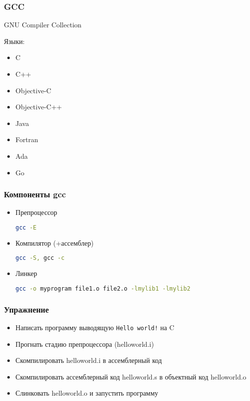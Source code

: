 \begin{frame}[fragile]
	\frametitle{GCC}

	\begin{block}{GNU Compiler Collection}

		Языки:

		\begin{itemize}
			\item C
			\item C++
			\item Objective-C
			\item Objective-C++
			\item Java
			\item Fortran
			\item Ada
			\item Go
		\end{itemize}
	\end{block}

\end{frame}



\begin{frame}[fragile]
\frametitle{Компоненты gcc}
\begin{itemize}
  \item Препроцессор
\begin{lstlisting}[language=sh]
gcc -E
\end{lstlisting}
  \item Компилятор (+ассемблер)
\begin{lstlisting}[language=sh]
gcc -S, gcc -c
\end{lstlisting}
  \item Линкер
\begin{lstlisting}[language=sh]
gcc -o myprogram file1.o file2.o -lmylib1 -lmylib2
\end{lstlisting}
\end{itemize}
\end{frame}

\begin{frame}
\frametitle{Упражнение}
\begin{itemize}
  \item Написать программу выводящую {\tt Hello world!} на C
  \item Прогнать стадию препроцессора (helloworld.i)
  \item Скомпилировать helloworld.i в ассемблерный код
  \item Скомпилировать ассемблерный код helloworld.s в объектный код helloworld.o
  \item Слинковать helloworld.o и запустить программу
\end{itemize}
\end{frame}


